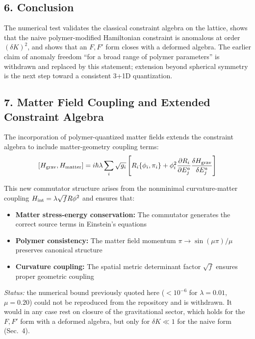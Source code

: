 \documentclass[12pt]{article}
\begin{document}
\subsection*{6. Conclusion}
The numerical test validates the classical constraint algebra on the lattice, shows that the naive polymer-modified Hamiltonian constraint is anomalous at order $(\delta K)^2$, and shows that an $F,F'$ form closes with a deformed algebra.  The earlier claim of anomaly freedom ``for a broad range of polymer parameters'' is withdrawn and replaced by this statement; extension beyond spherical symmetry is the next step toward a consistent 3+1D quantization.

\subsection*{7. Matter Field Coupling and Extended Constraint Algebra}

The incorporation of polymer-quantized matter fields extends the constraint algebra to include matter-geometry coupling terms:
\[
  [H_{\rm grav}, H_{\rm matter}] = i\hbar \lambda \sum_i \sqrt{g_i} \left[ R_i \{\phi_i, \pi_i\} + \phi_i^2 \frac{\partial R_i}{\partial E^a_j} \frac{\delta H_{\rm grav}}{\delta E^a_j} \right]
\]

This new commutator structure arises from the nonminimal curvature-matter coupling $H_{\rm int} = \lambda\sqrt{f}R\phi^2$ and ensures that:

\begin{itemize}
\item \textbf{Matter stress-energy conservation:} The commutator generates the correct source terms in Einstein's equations
\item \textbf{Polymer consistency:} The matter field momentum $\pi \to \sin(\mu\pi)/\mu$ preserves canonical structure
\item \textbf{Curvature coupling:} The spatial metric determinant factor $\sqrt{f}$ ensures proper geometric coupling
\end{itemize}

\emph{Status:} the numerical bound previously quoted here ($<10^{-6}$ for $\lambda=0.01$, $\mu=0.20$) could not be reproduced from the repository and is withdrawn.  It would in any case rest on closure of the gravitational sector, which holds for the $F,F'$ form with a deformed algebra, but only for $\delta K\ll1$ for the naive form (Sec.~4).
\end{document}
